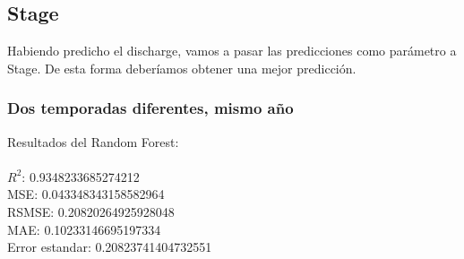 \documentclass{article}
\begin{document}
    \subsection{Stage}

    Habiendo predicho el discharge, vamos a pasar las predicciones como parámetro a Stage. De esta forma deberíamos obtener una mejor predicción.

        \subsubsection{Dos temporadas diferentes, mismo año}

            Resultados del Random Forest:\\
                    \\
                        $R^2$:  0.9348233685274212 \\
                        MSE:  0.043348343158582964 \\
                        RSMSE:  0.20820264925928048 \\
                        MAE:  0.10233146695197334 \\
                        Error estandar:  0.20823741404732551 \\
                
\end{document}
